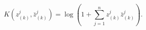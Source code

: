 \begin{equation}
K(z^j_{(k)}, {\bar z}^j_{(k)})=
\log{\left(1 + \sum_{j=1}^n z^j_{(k)} {\bar z}^j_{(k)}\right)}.
\label{fubst}
\end{equation} 
